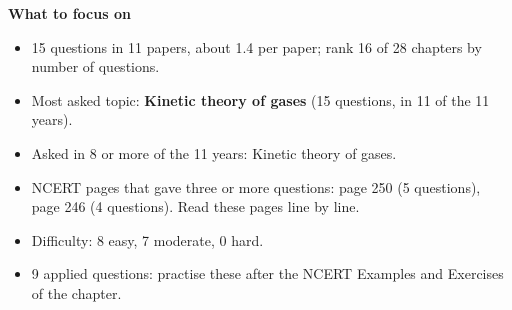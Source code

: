 \begin{minipage}[t]{0.63\linewidth}{\small\textbf{\color{crimson}What to focus on}\par\smallskip
\begin{itemize}[leftmargin=1.1em,itemsep=1pt,topsep=0pt]
\item 15 questions in 11 papers, about 1.4 per paper; rank 16 of 28 chapters by number of questions.
\item Most asked topic: \textbf{Kinetic theory of gases} (15 questions, in 11 of the 11 years).
\item Asked in 8 or more of the 11 years: Kinetic theory of gases.
\item NCERT pages that gave three or more questions: page 250 (5 questions), page 246 (4 questions). Read these pages line by line.
\item Difficulty: 8 easy, 7 moderate, 0 hard.
\item 9 applied questions: practise these after the NCERT Examples and Exercises of the chapter.
\end{itemize}}\end{minipage}\par
{}
